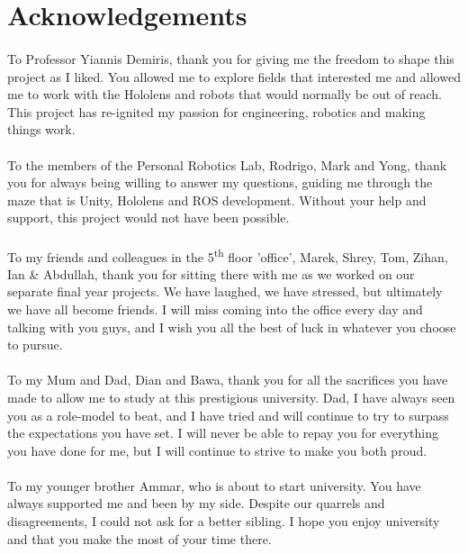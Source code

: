 \newpage
{}
\section*{Acknowledgements}

\paragraph{}To Professor Yiannis Demiris, thank you for giving me the freedom to shape this project as I liked. You allowed me to explore fields that interested me and allowed me to work with the Hololens and robots that would normally be out of reach. This project has re-ignited my passion for engineering, robotics and making things work.

\paragraph{}To the members of the Personal Robotics Lab, Rodrigo, Mark and Yong, thank you for always being willing to answer my questions, guiding me through the maze that is Unity, Hololens and ROS development. Without your help and support, this project would not have been possible.

\paragraph{}To my friends and colleagues in the 5\textsuperscript{th} floor 'office', Marek, Shrey, Tom, Zihan, Ian \& Abdullah, thank you for sitting there with me as we worked on our separate final year projects. We have laughed, we have stressed, but ultimately we have all become friends. I will miss coming into the office every day and talking with you guys, and I wish you all the best of luck in whatever you choose to pursue.

\paragraph{}To my Mum and Dad, Dian and Bawa, thank you for all the sacrifices you have made to allow me to study at this prestigious university. Dad, I have always seen you as a role-model to beat, and I have tried and will continue to try to surpass the expectations you have set. I will never be able to repay you for everything you have done for me, but I will continue to strive to make you both proud.

\paragraph{} To my younger brother Ammar, who is about to start university. You have always supported me and been by my side. Despite our quarrels and disagreements, I could not ask for a better sibling. I hope you enjoy university and that you make the most of your time there.

